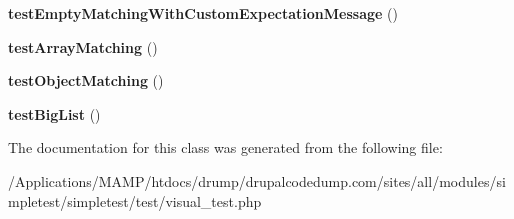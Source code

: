 \begin{DoxyCompactItemize}
\item 
\hypertarget{class_test_of_mock_objects_output_a3d628cd9ce507b0b77fe165d6e6bd772}{
{\bfseries testEmptyMatchingWithCustomExpectationMessage} ()}
\label{class_test_of_mock_objects_output_a3d628cd9ce507b0b77fe165d6e6bd772}

\item 
\hypertarget{class_test_of_mock_objects_output_a5b1888f7c86d7199e03e1e53da4b6d75}{
{\bfseries testArrayMatching} ()}
\label{class_test_of_mock_objects_output_a5b1888f7c86d7199e03e1e53da4b6d75}

\item 
\hypertarget{class_test_of_mock_objects_output_adb68a10d303d0e65a3534bb92cff0fd6}{
{\bfseries testObjectMatching} ()}
\label{class_test_of_mock_objects_output_adb68a10d303d0e65a3534bb92cff0fd6}

\item 
\hypertarget{class_test_of_mock_objects_output_a459a49365daad2f7621ed4208e213875}{
{\bfseries testBigList} ()}
\label{class_test_of_mock_objects_output_a459a49365daad2f7621ed4208e213875}

\end{DoxyCompactItemize}


The documentation for this class was generated from the following file:\begin{DoxyCompactItemize}
\item 
/Applications/MAMP/htdocs/drump/drupalcodedump.com/sites/all/modules/simpletest/simpletest/test/visual\_\-test.php\end{DoxyCompactItemize}
